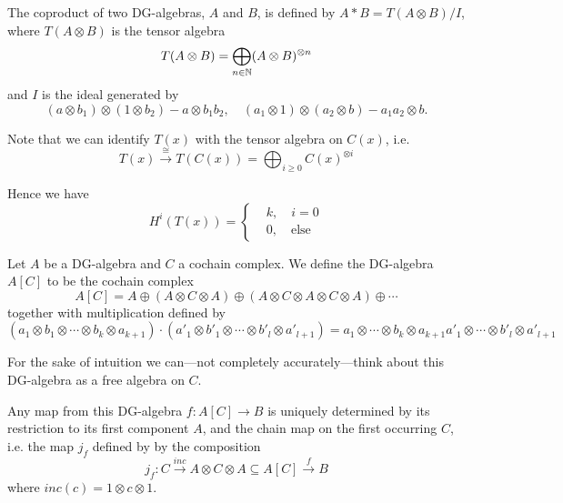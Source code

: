 The coproduct of two DG-algebras, $A$ and $B$, is defined by $A\ast B = T(A\otimes B)/I$, where $T(A\otimes B)$ is the tensor algebra
\begin{equation*}
    T(A\otimes B) = \bigoplus_{n \in \mathbb{N}}(A\otimes B)^{\otimes n}
\end{equation*}
and $I$ is the ideal generated by 
\begin{equation*}
	(a\otimes b_1)\otimes (1\otimes b_2) - a\otimes b_1 b_2, \quad (a_1\otimes 1)\otimes (a_2 \otimes b) - a_1 a_2 \otimes b.
\end{equation*}

Note that we can identify $T(x)$ with the tensor algebra on $C(x)$, i.e. 
\begin{equation*}
    T(x) \overset{\cong}\longrightarrow T(C(x)) = \bigoplus_{i\geq 0}C(x)^{\otimes i}
\end{equation*}

Hence we have 
\begin{equation*}
H^i(T(x)) = 
\begin{cases}
    &k, \quad i=0 \\
    &0, \quad \text{else}
\end{cases}
\end{equation*}

\begin{definition}
Let $A$ be a DG-algebra and $C$ a cochain complex. We define the DG-algebra $A[C]$ to be the cochain complex
\begin{equation*}
    A[C] = A\oplus (A\otimes C\otimes A) \oplus (A\otimes C \otimes A \otimes C \otimes A) \oplus \cdots
\end{equation*}
together with multiplication defined by 
\begin{equation*}
    (a_1\otimes b_1 \otimes \cdots \otimes b_k \otimes a_{k+1}) \cdot (a'_1\otimes b'_1 \otimes \cdots \otimes b'_l \otimes a'_{l+1}) = a_1 \otimes \cdots \otimes b_k \otimes a_{k+1}a'_1 \otimes \cdots \otimes b'_l \otimes a'_{l+1}
\end{equation*}
\end{definition}

For the sake of intuition we can---not completely accurately---think about this DG-algebra as a free algebra on $C$.

Any map from this DG-algebra $f:A[C]\longrightarrow B$ is uniquely determined by its restriction to its first component $A$, and the chain map on the first occurring $C$, i.e. the map $j_f$ defined by by the composition
\begin{equation*}
    j_f: C\overset{inc}\longrightarrow A\otimes C\otimes A \subseteq A[C]\overset{f}\longrightarrow B
\end{equation*}
where $inc(c) = 1\otimes c \otimes 1$. 

